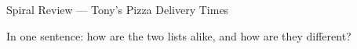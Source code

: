 \documentclass[12pt]{article}
\begin{document}
\begin{notesbox}{Spiral Review --- Tony's Pizza Delivery Times}
\begin{enumerate}[leftmargin=1.8em, itemsep=22pt, topsep=10pt]
        \vspace{8pt}
        In one sentence: how are the two lists alike, and how are they different?
        \par{}

\end{enumerate}
\end{notesbox}
\end{document}

